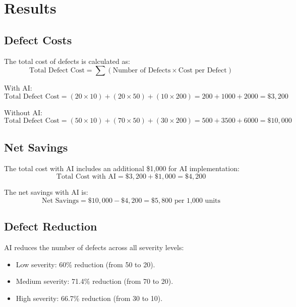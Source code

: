 \documentclass{article}
\begin{document}
\section{Results}
\subsection{Defect Costs}
The total cost of defects is calculated as:
\[
\text{Total Defect Cost} = \sum (\text{Number of Defects} \times \text{Cost per Defect})
\]

With AI:
\[
\text{Total Defect Cost} = (20 \times 10) + (20 \times 50) + (10 \times 200) = 200 + 1000 + 2000 = \$3,200
\]

Without AI:
\[
\text{Total Defect Cost} = (50 \times 10) + (70 \times 50) + (30 \times 200) = 500 + 3500 + 6000 = \$10,000
\]

\subsection{Net Savings}
The total cost with AI includes an additional \$1,000 for AI implementation:
\[
\text{Total Cost with AI} = \$3,200 + \$1,000 = \$4,200
\]

The net savings with AI is:
\[
\text{Net Savings} = \$10,000 - \$4,200 = \$5,800 \text{ per 1,000 units}
\]

\subsection{Defect Reduction}
AI reduces the number of defects across all severity levels:
\begin{itemize}
    \item Low severity: 60\% reduction (from 50 to 20).
    \item Medium severity: 71.4\% reduction (from 70 to 20).
    \item High severity: 66.7\% reduction (from 30 to 10).
\end{itemize}

\begin{figure}[h]
\centering
{}
\end{figure}
\end{document}
